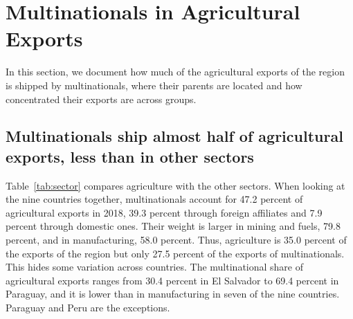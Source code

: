 \documentclass[article, 12pt, 3p]{elsarticle}
\numberwithin{corollary}{proposition}
\begin{document}
\section{Multinationals in Agricultural Exports}\label{sec:desc}

In this section, we document how much of the agricultural exports of the region is shipped by multinationals, where
their parents are located and how concentrated their exports are across groups.

\subsection{Multinationals ship almost half of agricultural exports, less than in other sectors}\label{sec:share}

Table~\ref{tab:sector} compares agriculture with the other sectors. When looking at the nine countries together,
multinationals account for 47.2 percent of agricultural exports in 2018, 39.3 percent through foreign affiliates and 7.9
percent through domestic ones. Their weight is larger in mining and fuels, 79.8 percent, and in manufacturing, 58.0
percent. Thus, agriculture is 35.0 percent of the exports of the region but only 27.5 percent of the exports of
multinationals. This hides some variation across countries. The multinational share of agricultural exports ranges
from 30.4 percent in El Salvador to 69.4 percent in Paraguay, and it is lower than in manufacturing in seven of the nine
countries. Paraguay and Peru are the exceptions.
\end{document}
